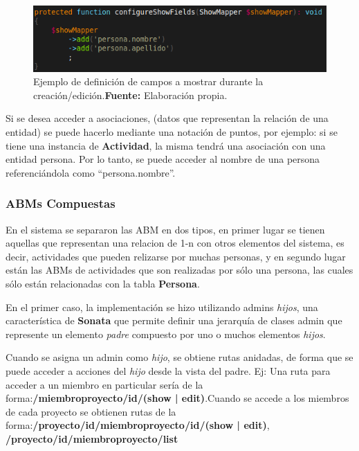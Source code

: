 \begin{figure}[h]
    \includegraphics[width=1\linewidth]{image/show.png}
    \caption{Ejemplo de definición de campos a mostrar durante la creación/edición.\newline \textbf{Fuente:} Elaboración propia.}
    \label{fig:image/show}
\end{figure}

Si se desea acceder a asociaciones, (datos que representan la relación de una entidad) se puede hacerlo mediante una notación de puntos, por ejemplo:
si se tiene una instancia de \textbf{Actividad}, la misma tendrá una asociación con una entidad persona\@. Por lo tanto, se puede acceder al nombre de una
persona referenciándola como ``persona.nombre''.

\subsubsection{ABMs Compuestas}%
\label{ssub:admin_proyectadmin_proyecto}

En el sistema se separaron las ABM en dos tipos, en primer lugar se tienen aquellas que representan una relacion de 1-n con otros elementos del sistema, es decir, actividades que pueden
relizarse por muchas personas, y en segundo lugar están las ABMs de actividades que son realizadas por sólo una persona, las cuales sólo están relacionadas con la tabla \textbf{Persona}\@.


En el primer caso, la implementación se hizo utilizando admins \textit{hijos}, una característica de \textbf{Sonata} que permite definir una jerarquía de clases admin que represente un
elemento \textit{padre} compuesto por uno o muchos elementos \textit{hijos}.

Cuando se asigna un admin como \textit{hijo}, se obtiene rutas anidadas, de forma que se puede acceder a acciones del \textit{hijo} desde la vista del padre. Ej: Una ruta
para acceder a un miembro en particular sería de la forma:\newline \textbf{/miembroproyecto/{id}/(show | edit)}\@.\newline\newline Cuando se accede a los
miembros de cada proyecto se obtienen rutas de la forma:\newline \textbf{/proyecto/{id}/miembroproyecto/{id}/(show | edit)},
\newline \textbf{/proyecto/{id}/miembroproyecto/list}\newline

